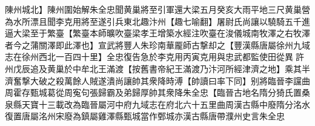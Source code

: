 陳州城北】陳州圍始解朱全忠聞黄巢將至引軍還大梁五月癸亥大雨平地三尺黄巢營為水所漂且聞李克用將至遂引兵東北趣汴州【趣七喻翻】屠尉氏尚讓以驍騎五千進逼大梁至于繁臺【繁臺本師曠吹臺梁孝王增築水經注吹臺在浚儀城南牧澤之右牧澤者今之蒲關澤即此澤也】宣武將豐人朱珍南華龎師古撃却之【豐漢縣唐屬徐州九域志在徐州西北一百四十里】全忠復告急於李克用丙寅克用與忠武都監使田從異許州戊辰追及黄巢於中牟北王滿渡【按舊書帝紀王滿渡乃汴河所經津濟之地】乘其半濟奮撃大破之殺萬餘人賊遂潰尚讓帥其衆降時溥【帥讀曰率下同】别將臨晉李讜曲周霍存甄城葛從周寃句張歸霸及弟歸厚帥其衆降朱全忠【臨晉古地名隋分猗氏置桑泉縣天寶十三載改為臨晉屬河中府九域志在府北六十五里曲周漢古縣中廢隋分洺水復置唐屬洺州宋廢為鎮屬雞澤縣甄城當作鄄城亦漢古縣唐帶濮州史言朱全忠